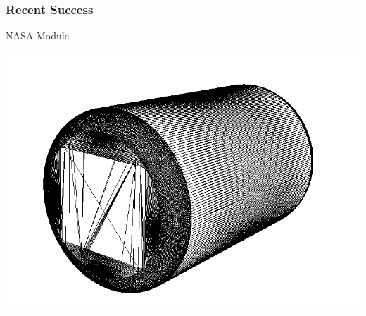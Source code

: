 \documentclass[14pt]{beamer}
\begin{document}
\begin{frame}
\frametitle{Recent Success}

NASA Module
\begin{center}
\includegraphics[scale=0.35]{bad_facets.png}
\end{center}
\end{frame}
\end{document}
